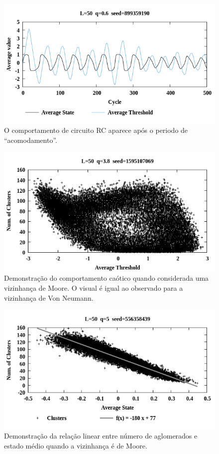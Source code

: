 \documentclass[12pt,a4paper,final]{article}
\begin{document}
  \begin{figure}[h]
    \centering
    \includegraphics[width=.7\linewidth]{ICA-L50-q0_600-seed899359190-AvgStateAvgThresVsCycle.png}
    \caption{O comportamento de circuito RC aparece após o periodo de ``acomodamento''.}
  \end{figure}

  \begin{figure}[h]
    \centering
    \includegraphics[width=.7\linewidth]{ICA-L50-q3_799-seed1595107069-ClusterVsAvgThres.png}
    \caption{Demonstração do comportamento caótico quando considerada uma vizinhança de Moore. O visual é igual ao observado para a vizinhança de Von Neumann.}
  \end{figure}

  \begin{figure}[h]
    \centering
    \includegraphics[width=.7\linewidth]{ICA-L50-q5_0-seed556358439-ClusterVsAvgState.png}
    \caption{Demonstração da relação linear entre número de aglomerados e estado médio quando a vizinhança é de Moore.}
  \end{figure}
\end{document}
